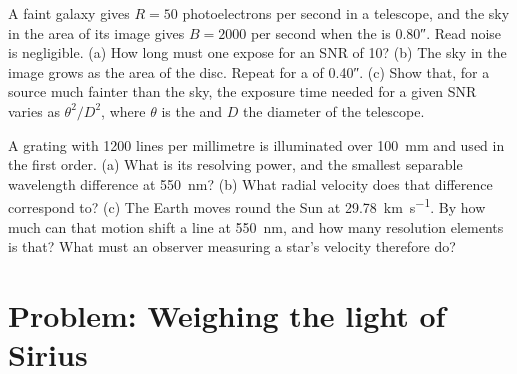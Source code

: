 \begin{exercise}[$\star\star\star$]\label{exo:b1:observing-the-sky:11}
A faint galaxy gives $R = 50$ photoelectrons per second in a telescope, and
the sky in the area of its image gives $B = \num{2000}$ per second when the
 is \ang{;;0.80}. Read noise is negligible. (a) How long must one
expose for an SNR of 10? (b) The sky in the image grows as the area of the
 disc. Repeat for a  of \ang{;;0.40}. (c) Show that, for a
source much fainter than the sky, the exposure time needed for a given SNR
varies as $\theta^2/D^2$, where $\theta$ is the  and $D$ the diameter
of the telescope.
\end{exercise}

\begin{exercise}[$\star\star\star$]\label{exo:b1:observing-the-sky:12}
A grating with 1200 lines per millimetre is illuminated over \qty{100}{mm}
and used in the first order. (a) What is its resolving power, and the
smallest separable wavelength difference at \qty{550}{nm}? (b) What radial
velocity does that difference correspond to? (c) The Earth moves round the
Sun at \qty{29.78}{km.s^{-1}}. By how much can that motion shift a line at
\qty{550}{nm}, and how many resolution elements is that? What must an
observer measuring a star's velocity therefore do?
\end{exercise}

\section{Problem: Weighing the light of Sirius}

